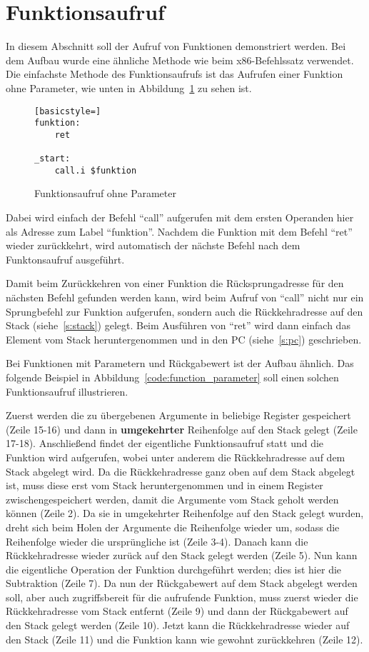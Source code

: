 \section{Funktionsaufruf}
In diesem Abschnitt soll der Aufruf von Funktionen demonstriert werden. Bei dem
Aufbau wurde eine ähnliche Methode wie beim x86-Befehlssatz verwendet. Die
einfachste Methode des Funktionsaufrufs ist das Aufrufen einer Funktion ohne
Parameter, wie unten in Abbildung~\ref{code:function_struct}  zu sehen ist.

\begin{figure}[htb]
\begin{lstlisting}[basicstyle=]
funktion:
	ret

_start:
	call.i $funktion
\end{lstlisting}
\caption{Funktionsaufruf ohne Parameter}
\label{code:function_struct}
\end{figure}

Dabei wird einfach der Befehl "`call"' aufgerufen mit dem ersten Operanden hier
als Adresse zum Label "`funktion"'. Nachdem die Funktion mit dem Befehl "`ret"'
wieder zurückkehrt, wird automatisch der nächste Befehl nach dem Funktonsaufruf
ausgeführt.

Damit beim Zurückkehren von einer Funktion die Rücksprungadresse für den
nächsten Befehl gefunden werden kann, wird beim Aufruf von "`call"' nicht nur ein
Sprungbefehl zur Funktion aufgerufen, sondern auch die Rückkehradresse auf den
Stack (siehe~\ref{s:stack}) gelegt. Beim Ausführen von "`ret"' wird dann einfach
das Element vom Stack heruntergenommen und in den PC (siehe~\ref{s:pc})
geschrieben.

Bei Funktionen mit Parametern und Rückgabewert ist der Aufbau ähnlich. Das
folgende Beispiel in Abbildung~\ref{code:function_parameter} soll einen solchen
Funktionsaufruf illustrieren.

Zuerst werden die zu übergebenen Argumente in beliebige Register gespeichert
(Zeile 15-16) und dann in \textbf{umgekehrter} Reihenfolge auf den Stack gelegt
(Zeile 17-18). Anschließend findet der eigentliche Funktionsaufruf statt und die
Funktion wird aufgerufen, wobei unter anderem die Rückkehradresse auf dem Stack
abgelegt wird. Da die Rückkehradresse ganz oben auf dem Stack abgelegt ist, muss
diese erst vom Stack heruntergenommen und in einem Register zwischengespeichert
werden, damit die Argumente vom Stack geholt werden können (Zeile 2). Da sie in
umgekehrter Reihenfolge auf den Stack gelegt wurden, dreht sich beim Holen der
Argumente die Reihenfolge wieder um, sodass die Reihenfolge wieder die
ursprüngliche ist (Zeile 3-4). Danach kann die Rückkehradresse wieder zurück auf
den Stack gelegt werden (Zeile 5). Nun kann die eigentliche Operation der
Funktion durchgeführt werden; dies ist hier die Subtraktion (Zeile 7). Da nun
der Rückgabewert auf dem Stack abgelegt werden soll, aber auch zugriffsbereit
für die aufrufende Funktion, muss zuerst wieder die Rückkehradresse vom Stack
entfernt (Zeile 9) und dann der Rückgabewert auf den Stack gelegt werden (Zeile
10). Jetzt kann die Rückkehradresse wieder auf den Stack (Zeile 11) und die
Funktion kann wie gewohnt zurückkehren (Zeile 12).

